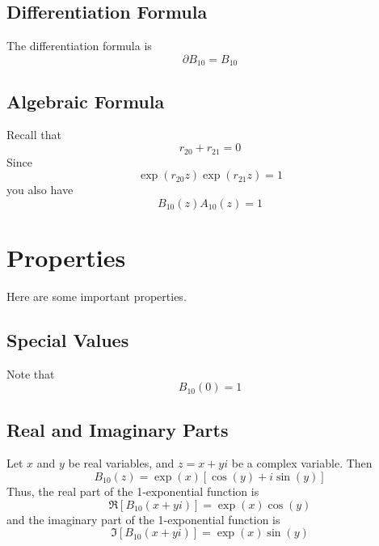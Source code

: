 \subsection{Differentiation Formula}
The differentiation formula is
\begin{equation}
    \partial B_{10} = B_{10}
\end{equation}
\subsection{Algebraic Formula}
Recall that
\begin{equation}
    r_{20} + r_{21} = 0
\end{equation}
Since
\begin{equation}
    \exp\left(r_{20} z\right) \exp\left(r_{21} z\right) = 1
\end{equation}
you also have
\begin{equation}
    B_{10}(z) A_{10}(z) = 1
\end{equation}
\section{Properties}
Here are some important properties.
\subsection{Special Values}
Note that
\begin{equation}
    B_{10}(0) = 1
\end{equation}
\subsection{Real and Imaginary Parts}
Let $x$ and $y$ be real variables, and $z = x + y i$ be a complex variable. Then
\begin{equation}
    B_{10}(z) = \exp({x}) \left[ \cos(y) + i \sin(y) \right]
\end{equation}
Thus, the real part of the 1-exponential function is
\begin{equation}
    \Re\left[ B_{10}(x + y i) \right] = \exp({x}) \cos(y)
\end{equation}
and the imaginary part of the 1-exponential function is
\begin{equation}
    \Im\left[ B_{10}(x + y i) \right] = \exp({x}) \sin(y)
\end{equation}
